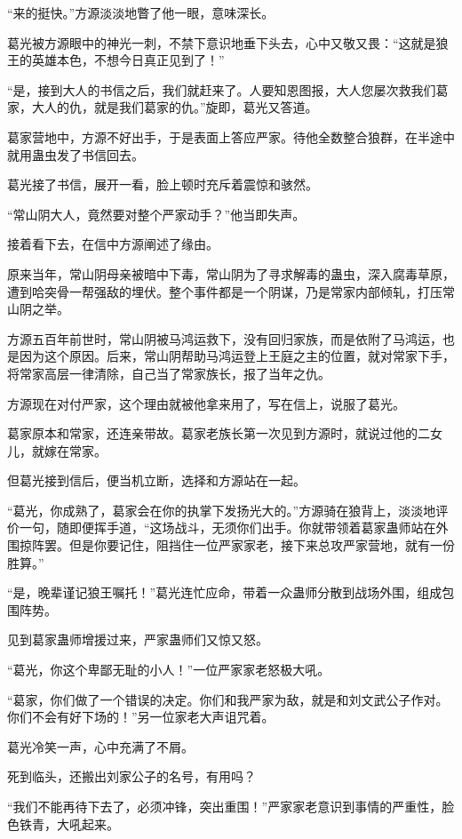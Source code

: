 \begin{this_body}
“来的挺快。”方源淡淡地瞥了他一眼，意味深长。

葛光被方源眼中的神光一刺，不禁下意识地垂下头去，心中又敬又畏：“这就是狼王的英雄本色，不想今日真正见到了！”

“是，接到大人的书信之后，我们就赶来了。人要知恩图报，大人您屡次救我们葛家，大人的仇，就是我们葛家的仇。”旋即，葛光又答道。

葛家营地中，方源不好出手，于是表面上答应严家。待他全数整合狼群，在半途中就用蛊虫发了书信回去。

葛光接了书信，展开一看，脸上顿时充斥着震惊和骇然。

“常山阴大人，竟然要对整个严家动手？”他当即失声。

接着看下去，在信中方源阐述了缘由。

原来当年，常山阴母亲被暗中下毒，常山阴为了寻求解毒的蛊虫，深入腐毒草原，遭到哈突骨一帮强敌的埋伏。整个事件都是一个阴谋，乃是常家内部倾轧，打压常山阴之举。

方源五百年前世时，常山阴被马鸿运救下，没有回归家族，而是依附了马鸿运，也是因为这个原因。后来，常山阴帮助马鸿运登上王庭之主的位置，就对常家下手，将常家高层一律清除，自己当了常家族长，报了当年之仇。

方源现在对付严家，这个理由就被他拿来用了，写在信上，说服了葛光。

葛家原本和常家，还连亲带故。葛家老族长第一次见到方源时，就说过他的二女儿，就嫁在常家。

但葛光接到信后，便当机立断，选择和方源站在一起。

“葛光，你成熟了，葛家会在你的执掌下发扬光大的。”方源骑在狼背上，淡淡地评价一句，随即便挥手道，“这场战斗，无须你们出手。你就带领着葛家蛊师站在外围掠阵罢。但是你要记住，阻挡住一位严家家老，接下来总攻严家营地，就有一份胜算。”

“是，晚辈谨记狼王嘱托！”葛光连忙应命，带着一众蛊师分散到战场外围，组成包围阵势。

见到葛家蛊师增援过来，严家蛊师们又惊又怒。

“葛光，你这个卑鄙无耻的小人！”一位严家家老怒极大吼。

“葛家，你们做了一个错误的决定。你们和我严家为敌，就是和刘文武公子作对。你们不会有好下场的！”另一位家老大声诅咒着。

葛光冷笑一声，心中充满了不屑。

死到临头，还搬出刘家公子的名号，有用吗？

“我们不能再待下去了，必须冲锋，突出重围！”严家家老意识到事情的严重性，脸色铁青，大吼起来。


\end{this_body}
